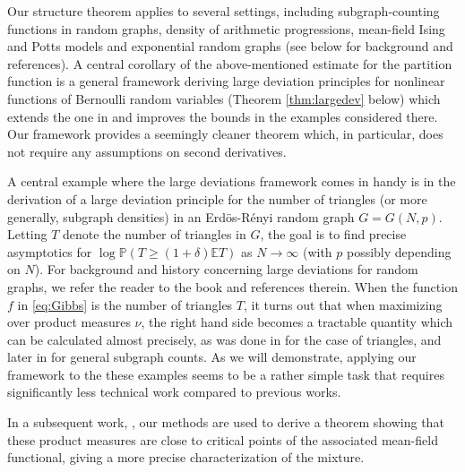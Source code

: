 \documentclass[12pt]{article}
\def \EE {\mathbb E}
\def \PP {\mathbb P}
\theoremstyle{definition}
\theoremstyle{remark}
\begin{document}
Our structure theorem applies to several settings, including subgraph-counting functions in random graphs, density of arithmetic progressions, mean-field Ising and Potts models and exponential random graphs (see below for background and references). A central corollary of the above-mentioned estimate for the partition function is a general framework deriving large deviation principles for nonlinear functions of Bernoulli random variables (Theorem \ref{thm:largedev} below) which extends the one in \cite{CD14} and improves the bounds in the examples considered there. Our framework provides a seemingly cleaner theorem which, in particular, does not require any assumptions on second derivatives.

A central example where the large deviations framework comes in handy is in the derivation of a large deviation principle for the number of triangles (or more generally, subgraph densities) in an Erd\"os-R\'enyi random graph $G=G(N,p)$. Letting $T$ denote the number of triangles in $G$, the goal is to find precise asymptotics for $\log \PP(T \geq (1+\delta) \EE T)$ as $N \to \infty$ (with $p$ possibly depending on $N$). For background and history concerning large deviations for random graphs, we refer the reader to the book \cite{Chattejee-LDRG} and references therein. When the function $f$ in \eqref{eq:Gibbs} is the number of triangles $T$, it turns out that when maximizing over product measures $\nu$, the right hand side becomes a tractable quantity which can be calculated almost precisely, as was done in \cite{LZ14} for the case of triangles, and later in \cite{BGLZ-Uppertails} for general subgraph counts. As we will demonstrate, applying our framework to the these examples seems to be a rather simple task that requires significantly less technical work compared to previous works.

In a subsequent work, \cite{EldanGross-Decomp}, our methods are used to derive a theorem showing that these product measures are close to critical points of the associated mean-field functional, giving a more precise characterization of the mixture.
\end{document}
